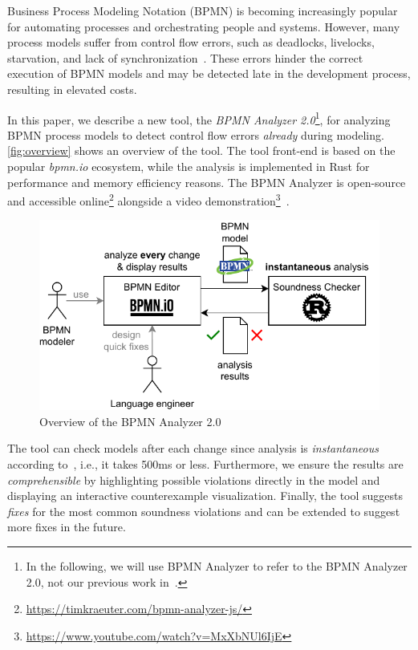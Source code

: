 \documentclass[
twocolumn
]{ceurart}
\begin{document}
Business Process Modeling Notation (BPMN) is becoming increasingly popular for automating processes and orchestrating people and systems.
However, many process models suffer from control flow errors, such as deadlocks, livelocks, starvation, and lack of synchronization~\cite{fahlandAnalysisDemandInstantaneous2011}.
These errors hinder the correct execution of BPMN models and may be detected late in the development process, resulting in elevated costs.

In this paper, we describe a new tool, the \textit{BPMN Analyzer 2.0}\footnote{
In the following, we will use BPMN Analyzer to refer to the BPMN Analyzer 2.0, not our previous work in~\cite{krauterHigherorderTransformationApproach2024}.}, for analyzing BPMN process models to detect control flow errors \textit{already} during modeling. %
\autoref{fig:overview} shows an overview of the tool.
The tool front-end is based on the popular \textit{bpmn.io} ecosystem, while the analysis is implemented in Rust for performance and memory efficiency reasons.
The BPMN Analyzer is open-source and accessible online\footnote{\url{https://timkraeuter.com/bpmn-analyzer-js/}} alongside a video demonstration\footnote{\url{https://www.youtube.com/watch?v=MxXbNUl6IjE}}~\cite{krauterInstantaneousComprehensibleFixable2024}.

\begin{figure}[ht]
	\centering
	\includegraphics[width=1\linewidth]{images/overview}
	\caption{Overview of the BPMN Analyzer 2.0}
	\label{fig:overview}
\end{figure}

The tool can check models after each change since analysis is \textit{instantaneous} according to~\cite{fahlandAnalysisDemandInstantaneous2011}, i.e., it takes 500ms or less.
Furthermore, we ensure the results are \textit{comprehensible} by highlighting possible violations directly in the model and displaying an interactive counterexample visualization.
Finally, the tool suggests \textit{fixes} for the most common soundness violations and can be extended to suggest more fixes in the future.
\end{document}
